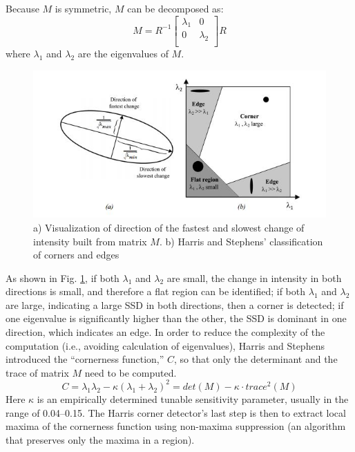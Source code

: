 \documentclass[twoside]{article}
\begin{document}
Because $M$ is symmetric, $M$ can be decomposed as:
\begin{equation}
M =
R^{-1}
\begin{bmatrix}
\lambda_1 & 0\\
0 & \lambda_2\\
\end{bmatrix}
R
\end{equation}
where $\lambda_1$ and $\lambda_2$ are the eigenvalues of $M$.
\begin{figure}
  \centering
  \includegraphics{harris.JPG}
    \caption{a) Visualization of direction of the fastest and slowest change of intensity built from matrix $M$. b) Harris and Stephens' classification of corners and edges \cite{SNS}}
    \label{harris}
\end{figure}

As shown in Fig. \ref{harris}, if both $\lambda_1$ and $\lambda_2$ are small, the change in intensity in both directions is small, and therefore a flat region can be identified; if both $\lambda_1$ and $\lambda_2$ are large, indicating a large SSD in both directions, then a corner is detected; if one eigenvalue is significantly higher than the other, the SSD is dominant in one direction, which indicates an edge. In order to reduce the complexity of the computation (i.e., avoiding calculation of eigenvalues), Harris and Stephens introduced the ``cornerness function,'' $C$, so that only the determinant and the trace of matrix $M$ need to be computed.
\begin{equation}
C = \lambda_1 \lambda_2 - \kappa(\lambda_1+\lambda_2)^2 = det(M) - \kappa\cdot trace^2(M)
\end{equation}
Here $\kappa$ is an empirically determined tunable sensitivity parameter, usually in the range of 0.04--0.15. The Harris corner detector's last step is then to extract local maxima of the cornerness function using non-maxima suppression (an algorithm that preserves only the maxima in a region). \\
\end{document}
